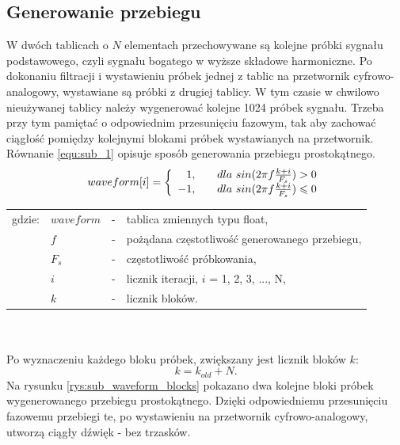 \subsection{Generowanie przebiegu}
W dwóch tablicach o $N$ elementach przechowywane są kolejne próbki sygnału podstawowego, czyli sygnału bogatego w wyższe składowe harmoniczne. Po dokonaniu filtracji i wystawieniu próbek jednej z tablic na przetwornik cyfrowo-analogowy, wystawiane są próbki z drugiej tablicy. W tym czasie w chwilowo nieużywanej tablicy należy wygenerować kolejne 1024 próbek sygnału. Trzeba przy tym pamiętać o odpowiednim przesunięciu fazowym, tak aby zachować ciągłość pomiędzy kolejnymi blokami próbek wystawianych na przetwornik. Równanie \ref{equ:sub_1} opisuje sposób generowania przebiegu prostokątnego.
\begin{equation} \label{equ:sub_1}
waveform[i]=\left \{\begin{array}{ r l }
1, & \quad \text{$dla$ } sin(2\pi f\frac{k+i}{F_s}) > 0\\
-1, & \quad  \text{$dla$ } sin(2\pi f\frac{k+i}{F_s}) \leqslant 0
\end{array}
\right.
\end{equation}
\begin{tabular}{ l l l l}
	gdzie: & $waveform$ &  - & tablica zmiennych typu float, \\
	&	$f$ & - &  pożądana częstotliwość generowanego przebiegu, \\
	&	$F_s$ & - & częstotliwość próbkowania,\\
	&	$i$ & - &  licznik iteracji, $i$ = 1, 2, 3, ..., N,\\
	&	$k$ & - &  licznik bloków.\\
\end{tabular} \\ \\
Po wyznaczeniu każdego bloku próbek, zwiększany jest licznik bloków $k$:
\begin{equation} \label{equ:sub_2}
k = k_{old} + N.
\end{equation}
Na rysunku \ref{rys:sub_waveform_blocks} pokazano dwa kolejne bloki próbek wygenerowanego przebiegu prostokątnego. Dzięki odpowiedniemu przesunięciu fazowemu przebiegi te, po wystawieniu na przetwornik cyfrowo-analogowy, utworzą ciągły dźwięk - bez trzasków.
